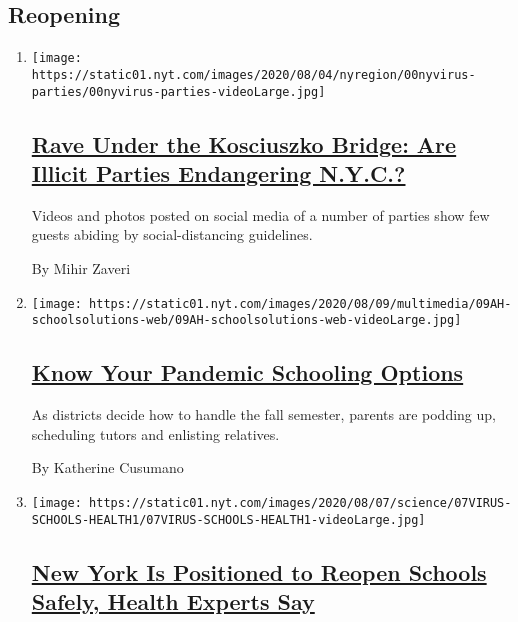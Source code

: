 \hypertarget{reopening}{%
\subsection{Reopening}\label{reopening}}

\begin{enumerate}
\def\labelenumi{\arabic{enumi}.}
\item
  \texttt{[image: https://static01.nyt.com/images/2020/08/04/nyregion/00nyvirus-parties/00nyvirus-parties-videoLarge.jpg]}

  \hypertarget{rave-under-the-kosciuszko-bridge-are-illicit-parties-endangering-nyc}{%
  \subsection{\texorpdfstring{\href{/2020/08/08/nyregion/nyc-illegal-parties.html}{Rave
  Under the Kosciuszko Bridge: Are Illicit Parties Endangering
  N.Y.C.?}}{Rave Under the Kosciuszko Bridge: Are Illicit Parties Endangering N.Y.C.?}}\label{rave-under-the-kosciuszko-bridge-are-illicit-parties-endangering-nyc}}

  Videos and photos posted on social media of a number of parties show
  few guests abiding by social-distancing guidelines.

  By Mihir Zaveri
\item
  \texttt{[image: https://static01.nyt.com/images/2020/08/09/multimedia/09AH-schoolsolutions-web/09AH-schoolsolutions-web-videoLarge.jpg]}

  \hypertarget{know-your-pandemic-schooling-options}{%
  \subsection{\texorpdfstring{\href{/2020/08/07/at-home/remote-school-options-coronavirus.html}{Know
  Your Pandemic Schooling
  Options}}{Know Your Pandemic Schooling Options}}\label{know-your-pandemic-schooling-options}}

  As districts decide how to handle the fall semester, parents are
  podding up, scheduling tutors and enlisting relatives.

  By Katherine Cusumano
\item
  \texttt{[image: https://static01.nyt.com/images/2020/08/07/science/07VIRUS-SCHOOLS-HEALTH1/07VIRUS-SCHOOLS-HEALTH1-videoLarge.jpg]}

  \hypertarget{new-york-is-positioned-to-reopen-schools-safely-health-experts-say}{%
  \subsection{\texorpdfstring{\href{/2020/08/07/health/coronavirus-ny-schools-reopen.html}{New
  York Is Positioned to Reopen Schools Safely, Health Experts
  Say}}{New York Is Positioned to Reopen Schools Safely, Health Experts Say}}\label{new-york-is-positioned-to-reopen-schools-safely-health-experts-say}}


\end{enumerate}
